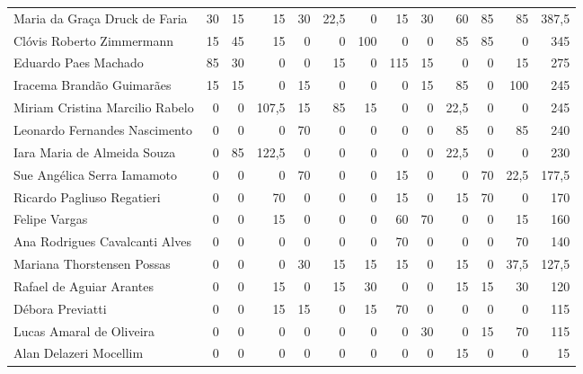 \documentclass[12pt,brazil]{article}\usepackage[]{graphicx}\usepackage[]{xcolor}
\begin{document}
\begin{longtable}{lrrrrrrrrrrrr}
Maria da Graça Druck de Faria & 30 & 15 & 15 & 30 & 22,5 & 0 & 15 & 30 & 60 & 85 & 85 & 387,5 \\
Clóvis Roberto Zimmermann & 15 & 45 & 15 & 0 & 0 & 100 & 0 & 0 & 85 & 85 & 0 & 345 \\
Eduardo Paes Machado & 85 & 30 & 0 & 0 & 15 & 0 & 115 & 15 & 0 & 0 & 15 & 275 \\
Iracema Brandão Guimarães & 15 & 15 & 0 & 15 & 0 & 0 & 0 & 15 & 85 & 0 & 100 & 245 \\
Miriam Cristina Marcilio Rabelo & 0 & 0 & 107,5 & 15 & 85 & 15 & 0 & 0 & 22,5 & 0 & 0 & 245 \\
Leonardo Fernandes Nascimento & 0 & 0 & 0 & 70 & 0 & 0 & 0 & 0 & 85 & 0 & 85 & 240 \\
Iara Maria de Almeida Souza & 0 & 85 & 122,5 & 0 & 0 & 0 & 0 & 0 & 22,5 & 0 & 0 & 230 \\
Sue Angélica Serra Iamamoto & 0 & 0 & 0 & 70 & 0 & 0 & 15 & 0 & 0 & 70 & 22,5 & 177,5 \\
Ricardo Pagliuso Regatieri & 0 & 0 & 70 & 0 & 0 & 0 & 15 & 0 & 15 & 70 & 0 & 170 \\
Felipe Vargas & 0 & 0 & 15 & 0 & 0 & 0 & 60 & 70 & 0 & 0 & 15 & 160 \\
Ana Rodrigues Cavalcanti Alves & 0 & 0 & 0 & 0 & 0 & 0 & 70 & 0 & 0 & 0 & 70 & 140 \\
Mariana Thorstensen Possas & 0 & 0 & 0 & 30 & 15 & 15 & 15 & 0 & 15 & 0 & 37,5 & 127,5 \\
Rafael de Aguiar Arantes & 0 & 0 & 15 & 0 & 15 & 30 & 0 & 0 & 15 & 15 & 30 & 120 \\
Débora Previatti & 0 & 0 & 15 & 15 & 0 & 15 & 70 & 0 & 0 & 0 & 0 & 115 \\
\hline Lucas Amaral de Oliveira & 0 & 0 & 0 & 0 & 0 & 0 & 0 & 30 & 0 & 15 & 70 & 115 \\
Alan Delazeri Mocellim & 0 & 0 & 0 & 0 & 0 & 0 & 0 & 0 & 15 & 0 & 0 & 15 \\
\end{longtable}


\clearpage
\end{document}
